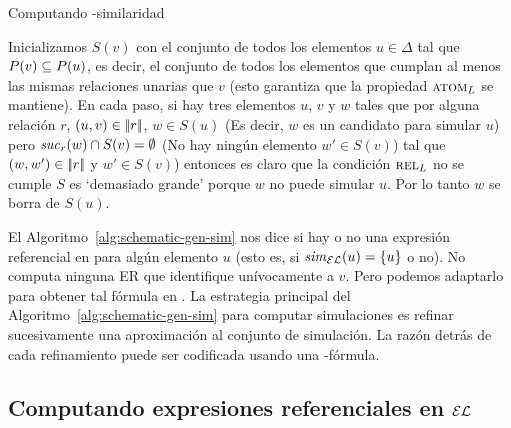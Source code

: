 


\begin{algorithm}
\small
\caption{ Computando \EL-similaridad\label{alg:schematic-gen-sim}}
 \BlankLine


\end{algorithm}

Inicializamos $S(v)$ con
el conjunto de todos los elementos $u\in\Delta$ tal que $P(v)\subseteq
P(u)$, es decir, el conjunto de todos los elementos que cumplan al menos las
mismas relaciones unarias que $v$ (esto garantiza que la propiedad $\textsc{atom}_L$ se mantiene).
En cada paso, si hay tres elementos $u$, $v$ y $w$ tales que
por alguna relaci\'on $r$, $(u,v) \in |\!|r|\!|$, $w\in S(u)$
(Es decir, $w$ es un candidato para simular $u$) pero ${\it suc}_{r}(w)\cap S(v) = \emptyset$
(No hay ning\'un elemento $w'\in S(v)$) tal que $(w, w') \in |\!|r|\!|$
y $w'\in S(v)$) entonces es claro que la condici\'on $\textsc{rel}_L$ no se cumple $S$ es `demasiado grande' porque
$w$ no puede simular $u$. Por lo tanto $w$ se borra de $S(u)$.


El Algoritmo~\ref{alg:schematic-gen-sim} nos dice si hay o no una expresi\'on referencial en \EL para alg\'un elemento $u$ (esto es, si
${\it sim}_{\mathcal{EL}}(u) = \{u\}$ o no). No computa ninguna ER que identifique un\'ivocamente a $v$. Pero
podemos adaptarlo para obtener tal f\'ormula en \EL.
La estrategia principal del Algoritmo~\ref{alg:schematic-gen-sim} para computar simulaciones es refinar sucesivamente una aproximaci\'on al conjunto de simulaci\'on.
La raz\'on detr\'as de cada refinamiento puede ser codificada usando una \EL-f\'ormula.

\subsection{Computando expresiones referenciales en $\mathcal{EL}$}
\label{sec:computandoEnEL}

